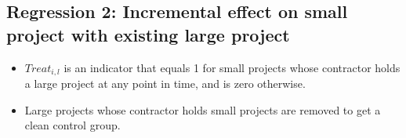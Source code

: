 \documentclass[
]{article}
\providecommand{\tightlist}{%
  \setlength{\itemsep}{0pt}\setlength{\parskip}{0pt}}
\begin{document}
\hypertarget{regression-2-incremental-effect-on-small-project-with-existing-large-project}{%
\subsection{Regression 2: Incremental effect on small project with
existing large
project}\label{regression-2-incremental-effect-on-small-project-with-existing-large-project}}

\begin{itemize}
\tightlist
\item
  \(Treat_{i,l}\) is an indicator that equals 1 for small projects whose
  contractor holds a large project at any point in time, and is zero
  otherwise.
\item
  Large projects whose contractor holds small projects are removed to
  get a clean control group.
\end{itemize}
\end{document}
